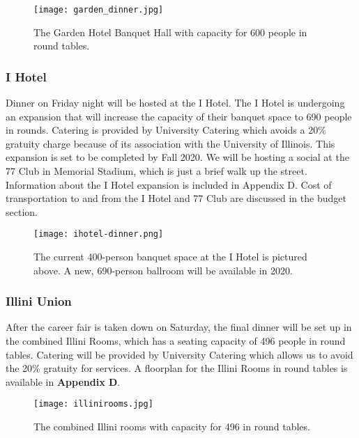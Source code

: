 \begin{figure}[H]
    \centering
    \texttt{[image: garden\_dinner.jpg]}
    \caption{The Garden Hotel Banquet Hall with capacity for 600 people in round tables.}
\end{figure}

\subsubsection{I Hotel}
Dinner on Friday night will be hosted at the I Hotel. The I Hotel is undergoing an expansion that will increase the capacity of their banquet space to 690 people in rounds. Catering is provided by University Catering which avoids a 20\% gratuity charge because of its association with the University of Illinois. This expansion is set to be completed by Fall 2020. We will be hosting a social at the 77 Club in Memorial Stadium, which is just a brief walk up the street. Information about the I Hotel expansion is included in Appendix D. Cost of transportation to and from the I Hotel and 77 Club are discussed in the budget section.

\begin{figure}[H]
    \centering
    \texttt{[image: ihotel-dinner.png]}
    \caption{The current 400-person banquet space at the I Hotel is pictured 
        above. A new, 690-person ballroom will be available in 2020.}
\end{figure}

\subsubsection{Illini Union}
After the career fair is taken down on Saturday, the final dinner will be set up in the combined Illini Rooms, which has a seating capacity of 496 people in round tables. Catering will be provided by University Catering which allows us to avoid the 20\% gratuity for services. A floorplan for the Illini Rooms in round tables is available in \textbf{Appendix D}.\\


\begin{figure}[H]
    \centering
    \texttt{[image: illinirooms.jpg]}
    \caption{The combined Illini rooms with capacity for 496 in round tables.}
\end{figure}


